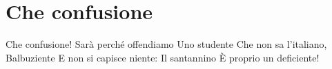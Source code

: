 \section{Che confusione}
\subtitle{Basata su “Sarà perché ti amo” dei Ricchi e Poveri}
\begin{canzone}
Che confusione!
Sarà perché offendiamo
Uno studente
Che non sa l’italiano,
Balbuziente
E non si capisce niente:
Il santannino
È proprio un deficiente!
\end{canzone}
